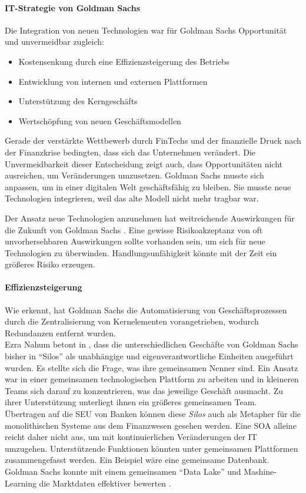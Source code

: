 \paragraph{IT-Strategie von Goldman Sachs}
Die Integration von neuen Technologien war für Goldman Sachs Opportunität und unvermeidbar \cite{Gupta:2017} zugleich:
\begin{itemize}
    \item Kostensenkung durch eine Effizienzsteigerung des Betriebs
    \item Entwicklung von internen und externen Plattformen
    \item Unterstützung des Kerngeschäfts
    \item Wertschöpfung von neuen Geschäftsmodellen
\end{itemize}

Gerade der verstärkte Wettbewerb durch FinTechs und der finanzielle Druck nach der Finanzkrise bedingten, dass sich das Unternehmen verändert. Die Unvermeidbarkeit dieser Entscheidung zeigt auch, dass Opportunitäten nicht ausreichen, um Veränderungen umzusetzen. Goldman Sachs musste sich anpassen, um in einer digitalen Welt geschäftsfähig zu bleiben. Sie musste neue Technologien integrieren, weil das alte Modell nicht mehr tragbar war.

Der Ansatz neue Technologien anzunehmen hat weitreichende Auswirkungen für die Zukunft von Goldman Sachs \cite{Gupta:2017}. Eine gewisse Risikoakzeptanz von oft unvorhersehbaren Auswirkungen sollte vorhanden sein, um sich für neue Technologien zu überwinden. Handlungsunfähigkeit könnte mit der Zeit ein größeres Risiko erzeugen. 

\paragraph{Effizienzsteigerung}
\label{par:effizienzsteig}
Wie \citet{Gupta:2017} erkennt, hat Goldman Sachs die Automatisierung von Geschäftsprozessen durch die Zentralisierung von Kernelementen vorangetrieben, wodurch Redundanzen entfernt wurden. 
\medskip
\\
Ezra Nahum betont in \cite[zitiert, S.5]{Gupta:2017}, dass die unterschiedlichen Geschäfte von Goldman Sachs bisher in \enquote{Silos} als unabhängige und eigenverantwortliche Einheiten ausgeführt wurden. Es stellte sich die Frage, was ihre gemeinsamen Nenner sind. Ein Ansatz war in einer gemeinsamen technologischen Plattform zu arbeiten und in kleineren Teams sich darauf zu konzentrieren, was das jeweilige Geschäft ausmacht. Zu ihrer Unterstützung unterliegt ihnen ein größeres gemeinsamen Team.
\medskip
\\
Übertragen auf die \ac{SEU} von Banken können diese \emph{Silos} \cite{Gupta:2017} auch als Metapher für die monolithischen Systeme \cite{Bussmann2006} aus dem Finanzwesen gesehen werden. Eine \ac{SOA} alleine reicht daher nicht aus, um mit kontinuierlichen Veränderungen der IT umzugehen. Unterstützende Funktionen könnten unter gemeinsamen Plattformen zusammengefasst werden. Ein Beispiel wäre eine gemeinsame Datenbank. Goldman Sachs konnte mit einem gemeinsamen \enquote{Data Lake} und Mashine-Learning die Marktdaten effektiver bewerten \cite{Gupta:2017}.

